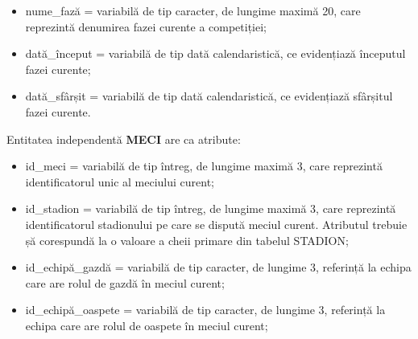 \documentclass{article}
\begin{document}
\begin{spacing}{1.1}
\begin{itemize}
		\item nume\_fază = variabilă de tip caracter, de lungime maximă 20, care reprezintă denumirea fazei curente a competiției;
		
		\item dată\_început = variabilă de tip dată calendaristică, ce evidențiază începutul fazei curente;
		
		\item dată\_sfârșit = variabilă de tip dată calendaristică, ce evidențiază sfârșitul fazei curente.
	\end{itemize}
	
	\vspace{0.5cm}
	
	Entitatea independentă \textbf{MECI} are ca atribute:
	
	\begin{itemize}
		\item id\_meci = variabilă de tip întreg, de lungime maximă 3, care reprezintă identificatorul unic al meciului curent;
		
		
		
		\item id\_stadion = variabilă de tip întreg, de lungime maximă 3, care reprezintă identificatorul stadionului pe care se dispută meciul curent. Atributul trebuie șă corespundă la o valoare a cheii primare din tabelul STADION;
		
		\item id\_echipă\_gazdă = variabilă de tip caracter, de lungime 3, referință la echipa care are rolul de gazdă în meciul curent;
		
		\item id\_echipă\_oaspete = variabilă de tip caracter, de lungime 3, referință la echipa care are rolul de oaspete în meciul curent;
		

\end{itemize}
\end{spacing}
\end{document}
